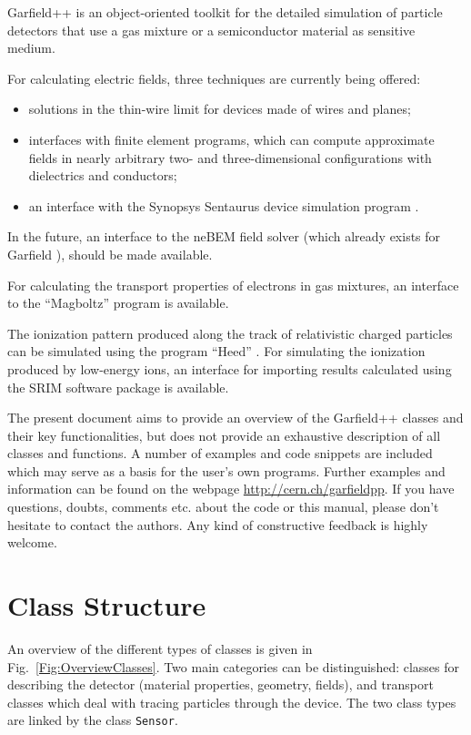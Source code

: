 Garfield++ is an object-oriented toolkit for the detailed simulation of 
particle detectors that use a gas mixture  
or a semiconductor material as sensitive medium. 

For calculating electric fields, three techniques are currently
being offered:
\begin{itemize}
  \item
  solutions in the thin-wire limit for devices made of wires and planes;
  \item
  interfaces with finite element programs, 
  which can compute approximate fields in nearly arbitrary 
  two- and three-dimensional configurations 
  with dielectrics and conductors;
  \item
  an interface with the Synopsys Sentaurus device simulation program
  \cite{Synopsys}.
\end{itemize}

In the future, an interface to the neBEM field solver 
\cite{Mukhopadhyay2007,Mukhopadhyay2006} 
(which already exists for Garfield \cite{GarfieldFortran}), 
should be made available.

For calculating the transport properties of electrons in gas 
mixtures, an interface to the ``Magboltz'' program 
\cite{BiagiMagboltz,Biagi1999} is available. 

The ionization pattern produced along the 
track of relativistic charged particles can be simulated using 
the program ``Heed'' \cite{Smirnov2005}.
For simulating the ionization produced by low-energy ions, 
an interface for importing results calculated using the 
SRIM software package \cite{Ziegler1985} 
is available.

The present document aims to provide an overview of the Garfield++ classes 
and their key functionalities, but does not provide an exhaustive 
description of all classes and functions.
A number of examples and code snippets are included 
which may serve as a basis for the user's own programs. 
Further examples and information can be found on the webpage 
\href{http://garfieldpp.web.cern.ch/garfieldpp/}{http://cern.ch/garfieldpp}.
If you have questions, doubts, comments etc. about the code or this manual, 
please don't hesitate to contact the authors.
Any kind of constructive feedback is highly welcome. 
 
\section{Class Structure}

An overview of the different types of classes is given in 
Fig.~\ref{Fig:OverviewClasses}. 
Two main categories can be distinguished: 
classes for describing the detector 
(material properties, geometry, fields), 
and transport classes which deal with tracing particles 
through the device. 
The two class types are linked by the class \texttt{Sensor}.

